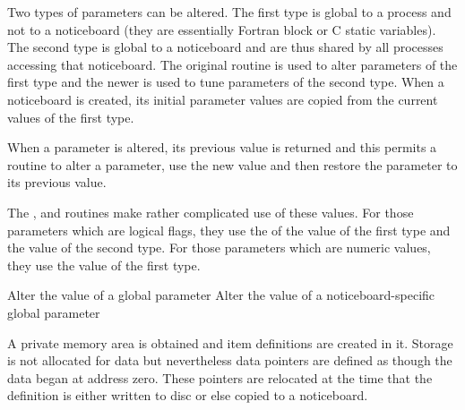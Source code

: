 
      Two types of parameters can be altered. The first type is global to a
      process and not to a noticeboard (they are essentially Fortran {}
      block or C static variables). The second type is global to a noticeboard
      and are thus shared by all processes accessing that noticeboard. The
      original {} routine is used to alter parameters of the %
first type
      and the newer {} is used to tune %
parameters of the
      second type. When a noticeboard is created, its initial parameter values
      are copied from the current values of the first type.

      When a parameter is altered, its previous value is returned and this
      permits a routine to alter a parameter, use the new value and then
      restore the parameter to its previous value.

      The {}, {} and {} %
routines make rather complicated use of
      these values. For those parameters which are logical flags, they use
      the {} of the value of the first type and the value of the %
second type.
      For those parameters which are numeric values, they use the value of the
      first type.

\begin{mansectionroutines}
      Alter the value of a global parameter
      Alter the value of a noticeboard-specific global parameter
\end{mansectionroutines}

      A private memory area is obtained and item definitions are created in it.
      Storage is not allocated for data but nevertheless data pointers are
      defined as though the data began at address zero. These pointers are
      relocated at the time that the definition is either written to disc or
      else copied to a noticeboard.


